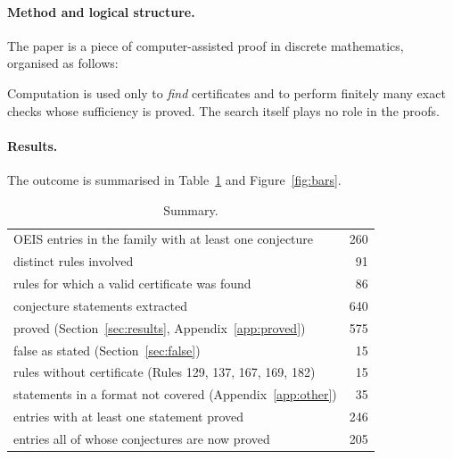 \documentclass[11pt]{article}
\theoremstyle{definition}
\theoremstyle{remark}
\begin{document}
\paragraph{Method and logical structure.} The paper is a piece of computer-assisted proof in discrete mathematics, organised as follows:
\begin{center}
\end{center}
Computation is used only to \emph{find} certificates and to perform finitely many exact checks whose sufficiency is proved. The search itself plays no role in the proofs.

\paragraph{Results.} The outcome is summarised in Table~\ref{tab:summary} and Figure~\ref{fig:bars}.

\begin{table}[ht]\centering
\begin{tabular}{lr}\toprule
OEIS entries in the family with at least one conjecture & 260\\
distinct rules involved & 91\\
rules for which a valid certificate was found & 86\\
conjecture statements extracted & 640\\
\quad proved (Section~\ref{sec:results}, Appendix~\ref{app:proved}) & 575\\
\quad false as stated (Section~\ref{sec:false}) & 15\\
\quad rules without certificate (Rules 129, 137, 167, 169, 182) & 15\\
\quad statements in a format not covered (Appendix~\ref{app:other}) & 35\\
entries with at least one statement proved & 246\\
entries all of whose conjectures are now proved & 205\\\bottomrule
\end{tabular}
\caption{Summary.}\label{tab:summary}
\end{table}
\end{document}
